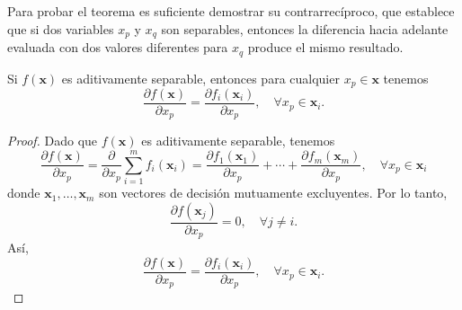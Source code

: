 Para probar el teorema es suficiente demostrar su contrarrecíproco, que establece que si dos variables \( x_p \) y \( x_q \) son separables, entonces la diferencia hacia adelante evaluada con dos valores diferentes para \( x_q \) produce el mismo resultado.

\begin{lema}
\label{L1}
Si \( f(\mathbf{x}) \) es aditivamente separable, entonces para cualquier \( x_p \in \mathbf{x} \) tenemos
\begin{equation}
\frac{\partial f(\mathbf{x})}{\partial x_p} = \frac{\partial f_i(\mathbf{x}_i)}{\partial x_p}, \quad \forall x_p \in \mathbf{x}_i.
\label{EQ8}
\end{equation}
\end{lema}

\begin{proof}
Dado que \( f(\mathbf{x}) \) es aditivamente separable, tenemos
\begin{equation}
\frac{\partial f(\mathbf{x})}{\partial x_p} = \frac{\partial}{\partial x_p} \sum_{i=1}^{m} f_i(\mathbf{x}_i) = \frac{\partial f_1(\mathbf{x}_1)}{\partial x_p} + \cdots + \frac{\partial f_m(\mathbf{x}_m)}{\partial x_p}, \quad \forall x_p \in \mathbf{x}_i
\label{EQ9}
\end{equation}
donde \( \mathbf{x}_1, \ldots, \mathbf{x}_m \) son vectores de decisión mutuamente excluyentes. Por lo tanto,
\begin{equation}
\frac{\partial f(\mathbf{x}_j)}{\partial x_p} = 0, \quad \forall j \neq i.
\label{EQ10}
\end{equation}
Así,
\begin{equation}
\frac{\partial f(\mathbf{x})}{\partial x_p} = \frac{\partial f_i(\mathbf{x}_i)}{\partial x_p}, \quad \forall x_p \in \mathbf{x}_i.
\label{EQ11}
\end{equation}
\end{proof}

